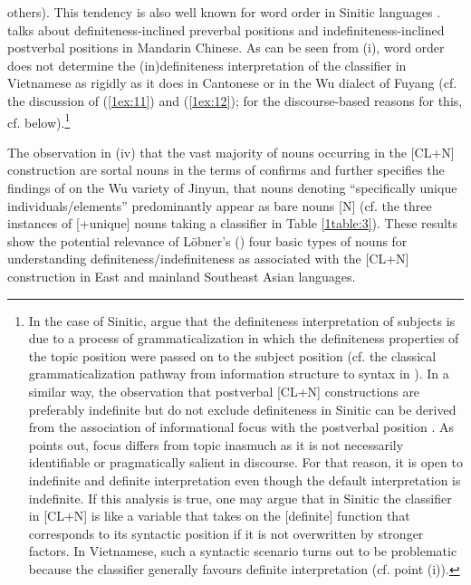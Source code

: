 \documentclass[output=paper]{langsci/langscibook}
\begin{document}
others). This tendency is also well known for word order in Sinitic languages  \citep{li:thompson:76,sun:givon:85,lapolla:95}. \cite[][1166]{chen:04} talks about definiteness-inclined preverbal positions and indefiniteness-inclined postverbal positions in Mandarin Chinese. As can be seen from (i), word order does not determine the (in)definiteness interpretation of the classifier in Vietnamese as rigidly as it does in Cantonese or in the Wu dialect of Fuyang (cf. the discussion of (\ref{1ex:11}) and (\ref{1ex:12}); for the discourse-based reasons for this, cf. below).\footnote{In the case of Sinitic, \cite{li:bisang:12} argue that the definiteness interpretation of subjects is due to a process of grammaticalization in which the definiteness properties of the topic position were passed on to the subject position (cf. the classical grammaticalization pathway from information structure to syntax in \citealt{givon:79}). In a similar way, the observation that postverbal [CL+N] constructions are preferably indefinite but do not exclude definiteness in Sinitic  can be derived from the association of informational focus with the postverbal position \citep{xu:04}. As \cite[][262]{lambrecht:94} points out, focus differs from topic inasmuch as it is not necessarily identifiable or pragmatically salient in discourse. For that reason, it is open to indefinite and definite interpretation even though the default interpretation is indefinite. If this analysis is true, one may argue that in Sinitic  the classifier in [CL+N] is like a variable that takes on the [\pm definite] function that corresponds to its syntactic position if it is not overwritten by stronger factors. In Vietnamese, such a syntactic scenario turns out to be problematic because the classifier generally favours definite interpretation (cf. point (i)).}

{
The observation in (iv) that the vast majority of nouns occurring in the [CL+N] construction are sortal nouns in the terms of \cite{lobner:85} confirms and further specifies the findings of \cite[][324]{simpson:17} on the Wu variety of Jinyun, that nouns denoting ``specifically unique individuals/elements'' predominantly appear as bare nouns [N] (cf. the three instances of [+unique] nouns taking a classifier in Table \ref{1table:3}). These results show the potential relevance of L\"obner's (\citeyear{lobner:85,lobner:11}) four basic types of nouns for understanding definiteness/indefiniteness as associated with the [CL+N] construction in East  and mainland Southeast Asian languages.
}
\end{document}
